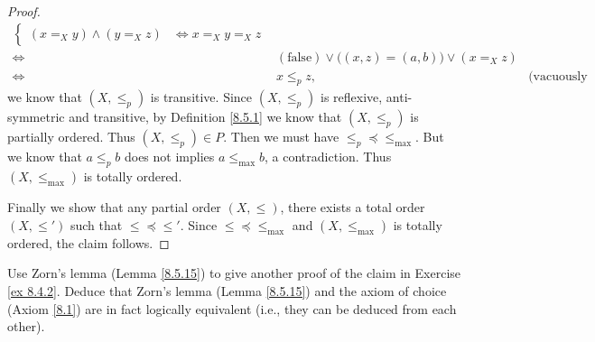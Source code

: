 \begin{proof}
\begin{align*}
\begin{cases}
            (x =_X y) \land (y =_X z)                                 & \iff x =_X y =_X z
        \end{cases}                                                             \\
        \iff & (\text{false}) \lor \big((x, z) = (a, b)\big) \lor (x =_X z)                           \\
        \iff & x \leq_p z,                                                  & \text{(vacuously true)}
    \end{align*}
    we know that \((X, \leq_p)\) is transitive.
    Since \((X, \leq_p)\) is reflexive, anti-symmetric and transitive, by Definition \ref{8.5.1} we know that \((X, \leq_p)\) is partially ordered.
    Thus \((X, \leq_p) \in P\).
    Then we must have \(\leq_p \preceq \leq_{\max}\).
    But we know that \(a \leq_p b\) does not implies \(a \leq_{\max} b\), a contradiction.
    Thus \((X, \leq_{\max})\) is totally ordered.

    Finally we show that any partial order \((X, \leq)\), there exists a total order \((X, \leq')\) such that \(\leq \preceq \leq'\).
    Since \(\leq \preceq \leq_{\max}\) and \((X, \leq_{\max})\) is totally ordered, the claim follows.
\end{proof}

\begin{exercise}\label{ex 8.5.17}
    Use Zorn's lemma (Lemma \ref{8.5.15}) to give another proof of the claim in Exercise \ref{ex 8.4.2}.
    Deduce that Zorn's lemma (Lemma \ref{8.5.15}) and the axiom of choice (Axiom \ref{8.1}) are in fact logically equivalent
    (i.e., they can be deduced from each other).
\end{exercise}

